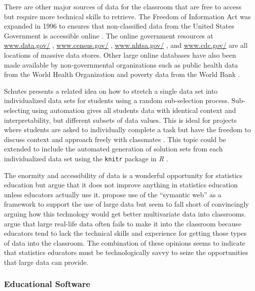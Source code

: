 \documentclass[11pt]{isuthesis}\usepackage[]{graphicx}\usepackage[]{color}
\begin{document}
There are other major sources of data for the classroom that are free to access but require more technical skills to retrieve.  The Freedom of Information Act was expanded in 1996 to ensures that non-classified data from the United States Government is accessible online \citep{FOIA}.  The online government resources at \url{www.data.gov/} \citep{DataGov}, \url{www.census.gov/} \citep{Census}, \url{www.nhtsa.gov/} \citep{NHTSA}, and \url{www.cdc.gov/} \citep{CDC} are all locations of massive data stores. Other large online databases have also been made available by non-governmental organizations such as public health data from the World Health Organization \citep{WHO} and poverty data from the World Bank  \citep{WorldBank}.

Schutes presents a related idea on how to stretch a single data set into individualized data sets for students using a random sub-selection process. Sub-selecting using automation gives all students data with identical context and interpretability, but different subsets of data values. This is ideal for projects where  students are asked to individually complete a task but have the freedom to discuss  context and approach freely with classmates \citep{Schutes2009}.  This topic could be extended to include the automated generation of solution sets from each individualized data set using the \texttt{knitr} package in \textit{R} \citep{Yihui}.

The enormity and accessibility of  data is a wonderful opportunity for statistics education but \citet{Nicholson2013} argue that it does not improve anything in statistics education unless educators actually use it. \citet{Ridgeway2013} propose use of the ``symantic web'' as a framework to support the use of large data but seem to fall short of convincingly arguing how this technology would get better multivariate data into classrooms. \citet{Finzer2007} argue that large real-life data often fails to make it into the classroom because educators tend to lack the technical skills and experience for getting those types of data into the classroom. The combination of these opinions seems to indicate that statistics educators must be technologically savvy to seize the opportunities that large data can provide.

\subsubsection{Educational Software} 
\end{document}
